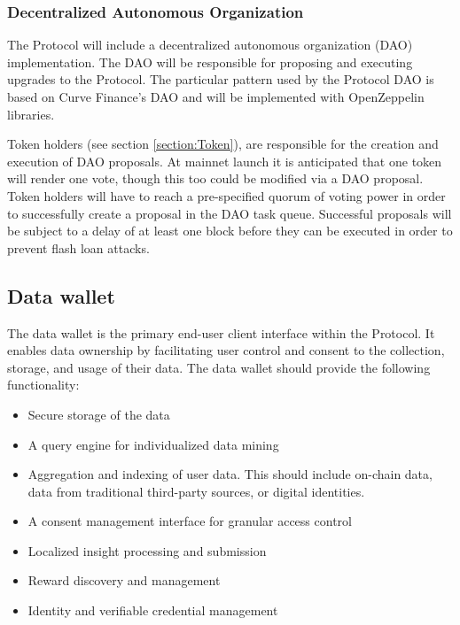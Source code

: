 \subsubsection{Decentralized Autonomous Organization}
\label{section:ImplementationDAO}

The Protocol will include a decentralized autonomous organization (DAO) implementation. The DAO will be responsible for proposing and executing upgrades to 
the Protocol. The particular pattern used by the Protocol DAO is based on Curve Finance's DAO and will be implemented with OpenZeppelin libraries. 

Token holders (see section \ref{section:Token}), are responsible for the creation and execution of DAO proposals. At mainnet launch it is anticipated that one 
token will render one vote, though this too could be modified via a DAO proposal. Token holders will have to reach a pre-specified quorum of voting power in 
order to successfully create a proposal in the DAO task queue. Successful proposals will be subject to a delay of at least one block before they can be executed 
in order to prevent flash loan attacks. 

\subsection{Data wallet}
\label{section:DataWallet}





The data wallet is the primary end-user client interface within the Protocol. It enables data ownership by facilitating user control 
and consent to the collection, storage, and usage of their data. The data wallet should provide the following functionality:
\begin{itemize}
  \item Secure storage of the data
  \item A query engine for individualized data mining
  \item Aggregation and indexing of user data. This should include on-chain data, data from traditional third-party sources, or digital identities.
  \item A consent management interface for granular access control
  \item Localized insight processing and submission
  \item Reward discovery and management
  \item Identity and verifiable credential management
\end{itemize}

